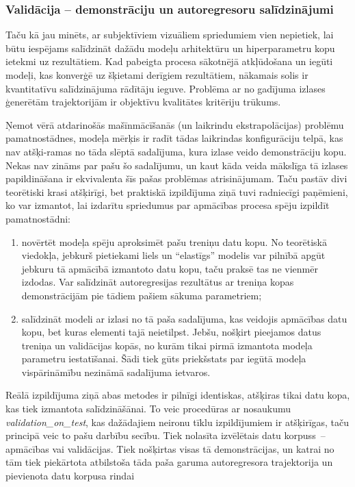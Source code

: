 \documentclass[12pt, a4paper]{article}
\numberwithin{equation}{section} %
\begin{document}
\subsubsection{Validācija -- demonstrāciju un autoregresoru salīdzinājumi}

Taču kā jau minēts, ar subjektīviem vizuāliem spriedumiem vien nepietiek, lai būtu iespējams salīdzināt dažādu modeļu arhitektūru un hiperparametru kopu ietekmi uz rezultātiem. Kad pabeigta procesa sākotnējā atkļūdošana un iegūti modeļi, kas konverģē uz šķietami derīgiem rezultātiem, nākamais solis ir kvantitatīvu salīdzinājuma rādītāju ieguve. Problēma ar no gadījuma izlases ģenerētām trajektorijām ir objektīvu kvalitātes kritēriju trūkums. 

Ņemot vērā atdarinošās mašīnmācīšanās (un laikrindu ekstrapolācijas) problēmu pamatnostādnes, modeļa mērķis ir radīt tādas laikrindas konfigurāciju telpā, kas nav atšķi-ramas no tāda slēptā sadalījuma, kura izlase veido demonstrāciju kopu. Nekas nav zināms par pašu šo sadalījumu, un kaut kāda veida mākslīga tā izlases papildināšana ir ekvivalenta šīs pašas problēmas atrisinājumam. Taču pastāv divi teorētiski krasi atšķirīgi, bet praktiskā izpildījuma ziņā tuvi radniecīgi paņēmieni, ko var izmantot, lai izdarītu spriedumus par apmācības procesa spēju izpildīt pamatnostādni:

\begin{enumerate}
    \item novērtēt modeļa spēju aproksimēt pašu treniņu datu kopu. No teorētiskā viedokļa, jebkurš pietiekami liels un ``elastīgs'' modelis var pilnībā apgūt jebkuru tā apmācībā izmantoto datu kopu, taču praksē tas ne vienmēr izdodas. Var salīdzināt autoregresijas rezultātus ar treniņa kopas demonstrācijām pie tādiem pašiem sākuma parametriem;
    \item salīdzināt modeli ar izlasi no tā paša sadalījuma, kas veidojis apmācības datu kopu, bet kuras elementi tajā neietilpst. Jebšu, nošķirt pieejamos datus treniņa un validācijas kopās, no kurām tikai pirmā izmantota modeļa parametru iestatīšanai. Šādi tiek gūts priekšstats par iegūtā modeļa vispārināmību nezināmā sadalījuma ietvaros.
\end{enumerate}

Reālā izpildījuma ziņā abas metodes ir pilnīgi identiskas, atšķiras tikai datu kopa, kas tiek izmantota salīdzināšānai. To veic procedūras ar nosaukumu \textit{validation\_on\_test}, kas dažādajiem neironu tīklu izpildījumiem ir atšķirīgas, taču principā veic to pašu darbību secību. Tiek nolasīta izvēlētais datu korpuss~-- apmācības vai validācijas. Tiek nošķirtas visas tā demonstrācijas, un katrai no tām tiek piekārtota atbilstoša tāda paša garuma autoregresora trajektorija un pievienota datu korpusa rindai
\end{document}
